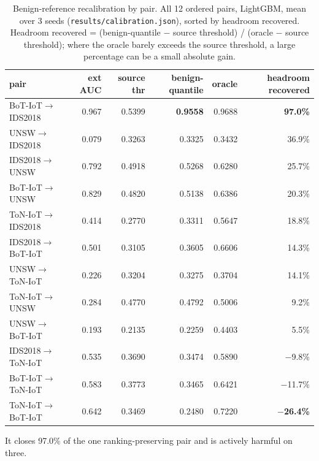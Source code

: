 \documentclass[journal]{IEEEtran}
\begin{document}
\begin{table}[htbp]\centering\scriptsize
\caption{Benign-reference recalibration by pair. All 12 ordered pairs, LightGBM, mean over 3 seeds (\texttt{results/calibration.json}), sorted by headroom recovered. Headroom recovered = (benign-quantile $-$ source threshold) / (oracle $-$ source threshold); where the oracle barely exceeds the source threshold, a large percentage can be a small absolute gain.}
\begin{tabular}{lrrrrr}
\toprule
pair & ext AUC & source thr & benign-quantile & oracle & headroom recovered \\
\midrule
BoT-IoT$\rightarrow$IDS2018 & 0.967 & 0.5399 & \textbf{0.9558} & 0.9688 & \textbf{97.0\%} \\
UNSW$\rightarrow$IDS2018 & 0.079 & 0.3263 & 0.3325 & 0.3432 & 36.9\% \\
IDS2018$\rightarrow$UNSW & 0.792 & 0.4918 & 0.5268 & 0.6280 & 25.7\% \\
BoT-IoT$\rightarrow$UNSW & 0.829 & 0.4820 & 0.5138 & 0.6386 & 20.3\% \\
ToN-IoT$\rightarrow$IDS2018 & 0.414 & 0.2770 & 0.3311 & 0.5647 & 18.8\% \\
IDS2018$\rightarrow$BoT-IoT & 0.501 & 0.3105 & 0.3605 & 0.6606 & 14.3\% \\
UNSW$\rightarrow$ToN-IoT & 0.226 & 0.3204 & 0.3275 & 0.3704 & 14.1\% \\
ToN-IoT$\rightarrow$UNSW & 0.284 & 0.4770 & 0.4792 & 0.5006 & 9.2\% \\
UNSW$\rightarrow$BoT-IoT & 0.193 & 0.2135 & 0.2259 & 0.4403 & 5.5\% \\
IDS2018$\rightarrow$ToN-IoT & 0.535 & 0.3690 & 0.3474 & 0.5890 & $-$9.8\% \\
BoT-IoT$\rightarrow$ToN-IoT & 0.583 & 0.3773 & 0.3465 & 0.6421 & $-$11.7\% \\
ToN-IoT$\rightarrow$BoT-IoT & 0.642 & 0.3469 & 0.2480 & 0.7220 & \textbf{$-$26.4\%} \\
\bottomrule
\end{tabular}
\end{table}

It closes 97.0\% of the one ranking-preserving pair and is actively harmful on three.
\end{document}
